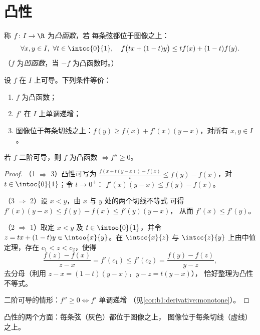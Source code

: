 \section{凸性}

\begin{definition}\label{def:b1:derivative:convex}
称 $f \colon I \to \R$ 为\emph{凸函数}，若
每条弦都位于图像之上：
\[
\forall x, y \in I,\ \forall t \in \intcc{0}{1}, \quad
f\bigl(tx + (1-t)y\bigr) \leq t f(x) + (1-t) f(y).
\]
（$f$ 为\emph{凹函数}，当 $-f$ 为凸函数时。）
\end{definition}

\begin{theorem}[凸性的微分刻画]\label{thm:b1:derivative:convexchar}
设 $f$ 在 $I$ 上可导。下列条件等价：
\begin{enumerate}
  \item $f$ 为凸函数；
  \item $f'$ 在 $I$ 上单调递增；
  \item 图像位于每条切线之上：$f(y) \geq f(x) +
        f'(x)(y - x)$，对所有 $x, y \in I$。
\end{enumerate}
若 $f$ 二阶可导，则 $f$ 为凸函数 $\iff f'' \geq 0$。
\end{theorem}

\begin{proof}
（1 $\Rightarrow$ 3）凸性可写为 $\frac{f(x + t(y-x)) -
f(x)}{t} \leq f(y) - f(x)$，对 $t \in \intoc{0}{1}$；令 $t \to 0^+$：
$f'(x)(y - x) \leq f(y) - f(x)$。

（3 $\Rightarrow$ 2）设 $x < y$，由 $x$ 与 $y$ 处的两个切线不等式
可得 $f'(x)(y-x) \leq f(y) - f(x) \leq f'(y)(y - x)$，
从而 $f'(x) \leq f'(y)$。

（2 $\Rightarrow$ 1）取定 $x < y$ 及 $t \in \intoo{0}{1}$，并令 $z
= tx + (1-t)y \in \intoo{x}{y}$。在
$\intcc{x}{z}$ 与 $\intcc{z}{y}$ 上由中值定理，存在 $c_1 < z < c_2$，使得
\[
\frac{f(z) - f(x)}{z - x} = f'(c_1) \leq f'(c_2)
= \frac{f(y) - f(z)}{y - z} ,
\]
去分母（利用 $z - x = (1-t)(y-x)$，$y - z = t(y-x)$），
恰好整理为凸性不等式。

二阶可导的情形：$f'' \geq 0 \iff f'$ 单调递增
（见\cref{cor:b1:derivative:monotone}）。
\end{proof}

\begin{omfigure}

{\small 凸性的两个方面：每条弦（灰色）都位于图像之上，
图像位于每条切线（虚线）之上。}
\end{omfigure}

